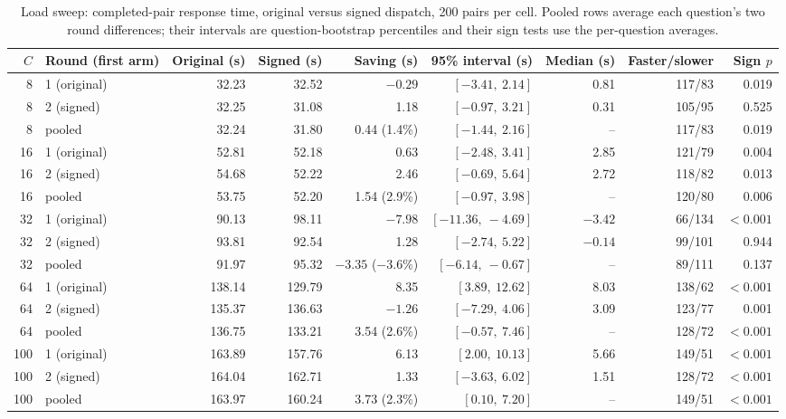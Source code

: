 \documentclass[paper]{ieice}
\begin{document}
\begin{table}[!t]
\caption{Load sweep: completed-pair response time, original versus signed dispatch, 200 pairs per cell. Pooled rows average each question's two round differences; their intervals are question-bootstrap percentiles and their sign tests use the per-question averages.}
\label{tab:sweep}
\centering\footnotesize
\setlength{\tabcolsep}{2.5pt}
\begin{tabular}{rlrrrrrrr}
\toprule
$C$ & Round (first arm) & Original (s) & Signed (s) & Saving (s) & 95\% interval (s) & Median (s) & Faster/slower & Sign $p$\\
\midrule
8 & 1 (original) & 32.23 & 32.52 & $-0.29$ & $[-3.41,\ 2.14]$ & 0.81 & 117/83 & 0.019\\
8 & 2 (signed) & 32.25 & 31.08 & 1.18 & $[-0.97,\ 3.21]$ & 0.31 & 105/95 & 0.525\\
8 & pooled & 32.24 & 31.80 & 0.44 (1.4\%) & $[-1.44,\ 2.16]$ & -- & 117/83 & 0.019\\
\midrule
16 & 1 (original) & 52.81 & 52.18 & 0.63 & $[-2.48,\ 3.41]$ & 2.85 & 121/79 & 0.004\\
16 & 2 (signed) & 54.68 & 52.22 & 2.46 & $[-0.69,\ 5.64]$ & 2.72 & 118/82 & 0.013\\
16 & pooled & 53.75 & 52.20 & 1.54 (2.9\%) & $[-0.97,\ 3.98]$ & -- & 120/80 & 0.006\\
\midrule
32 & 1 (original) & 90.13 & 98.11 & $-7.98$ & $[-11.36,\ -4.69]$ & $-3.42$ & 66/134 & $<0.001$\\
32 & 2 (signed) & 93.81 & 92.54 & 1.28 & $[-2.74,\ 5.22]$ & $-0.14$ & 99/101 & 0.944\\
32 & pooled & 91.97 & 95.32 & $-3.35$ ($-3.6$\%) & $[-6.14,\ -0.67]$ & -- & 89/111 & 0.137\\
\midrule
64 & 1 (original) & 138.14 & 129.79 & 8.35 & $[3.89,\ 12.62]$ & 8.03 & 138/62 & $<0.001$\\
64 & 2 (signed) & 135.37 & 136.63 & $-1.26$ & $[-7.29,\ 4.06]$ & 3.09 & 123/77 & 0.001\\
64 & pooled & 136.75 & 133.21 & 3.54 (2.6\%) & $[-0.57,\ 7.46]$ & -- & 128/72 & $<0.001$\\
\midrule
100 & 1 (original) & 163.89 & 157.76 & 6.13 & $[2.00,\ 10.13]$ & 5.66 & 149/51 & $<0.001$\\
100 & 2 (signed) & 164.04 & 162.71 & 1.33 & $[-3.63,\ 6.02]$ & 1.51 & 128/72 & $<0.001$\\
100 & pooled & 163.97 & 160.24 & 3.73 (2.3\%) & $[0.10,\ 7.20]$ & -- & 149/51 & $<0.001$\\
\bottomrule
\end{tabular}
\end{table}
\end{document}
